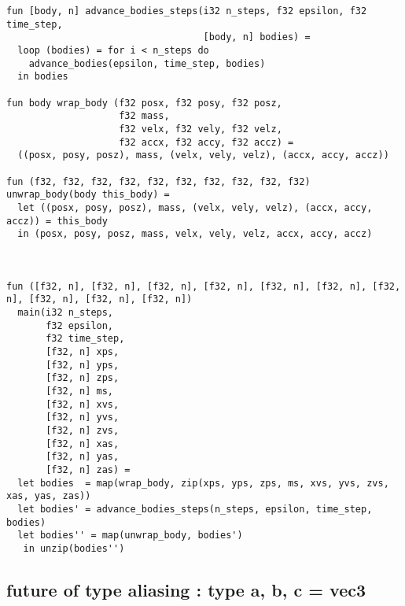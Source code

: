 \begin{lstlisting}
fun [body, n] advance_bodies_steps(i32 n_steps, f32 epsilon, f32 time_step,
                                   [body, n] bodies) =
  loop (bodies) = for i < n_steps do
    advance_bodies(epsilon, time_step, bodies)
  in bodies

fun body wrap_body (f32 posx, f32 posy, f32 posz,
                    f32 mass,
                    f32 velx, f32 vely, f32 velz,
                    f32 accx, f32 accy, f32 accz) =
  ((posx, posy, posz), mass, (velx, vely, velz), (accx, accy, accz))

fun (f32, f32, f32, f32, f32, f32, f32, f32, f32, f32) unwrap_body(body this_body) =
  let ((posx, posy, posz), mass, (velx, vely, velz), (accx, accy, accz)) = this_body
  in (posx, posy, posz, mass, velx, vely, velz, accx, accy, accz)



fun ([f32, n], [f32, n], [f32, n], [f32, n], [f32, n], [f32, n], [f32, n], [f32, n], [f32, n], [f32, n])
  main(i32 n_steps,
       f32 epsilon,
       f32 time_step,
       [f32, n] xps,
       [f32, n] yps,
       [f32, n] zps,
       [f32, n] ms,
       [f32, n] xvs,
       [f32, n] yvs,
       [f32, n] zvs,
       [f32, n] xas,
       [f32, n] yas,
       [f32, n] zas) =
  let bodies  = map(wrap_body, zip(xps, yps, zps, ms, xvs, yvs, zvs, xas, yas, zas))
  let bodies' = advance_bodies_steps(n_steps, epsilon, time_step, bodies)
  let bodies'' = map(unwrap_body, bodies')
   in unzip(bodies'')
\end{lstlisting}

\subsection{future of type aliasing : type a, b, c = vec3}